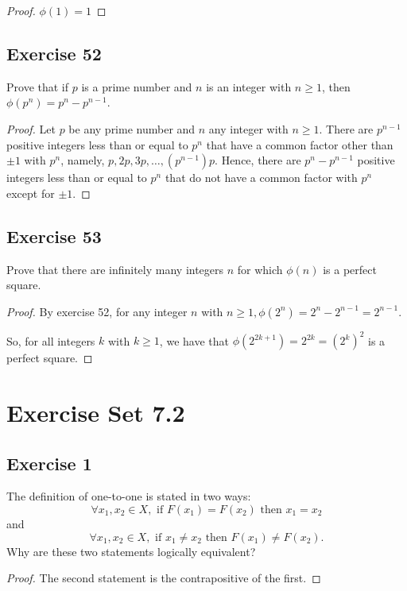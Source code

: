 \documentclass[14pt]{extarticle}
\begin{document}
\begin{proof}
    \(\phi(1) = 1\)
\end{proof}

\subsection{Exercise 52}
Prove that if $p$ is a prime number and $n$ is an integer with \(n \geq 1\), then \(\phi(p^n) = p^n - p^{n-1}\).

\begin{proof}
    Let $p$ be any prime number and $n$ any integer with \(n \geq 1\). There are \(p^{n-1}\) positive integers less than
    or equal to \(p^n\) that have a common factor other than $\pm 1$ with \(p^n\), namely, \(p, 2p, 3p, \ldots,
    (p^{n-1})p\). Hence, there are \(p^n - p^{n-1}\) positive integers less than or equal to \(p^n\) that do not have a
    common factor with \(p^n\) except for $\pm 1$.
\end{proof}

\subsection{Exercise 53}
Prove that there are infinitely many integers $n$ for which \(\phi(n)\) is a perfect square.

\begin{proof}
    By exercise 52, for any integer $n$ with \(n \geq 1, \phi(2^n) = 2^n - 2^{n-1} = 2^{n-1}\).

    So, for all integers $k$ with $k \geq 1$, we have that \(\phi(2^{2k+1}) = 2^{2k} = (2^k)^2\) is a perfect square.
\end{proof}

\section{Exercise Set 7.2}

\subsection{Exercise 1}
The definition of one-to-one is stated in two ways:
\[
    \forall x_1, x_2 \in X, \text{ if } F(x_1) = F(x_2) \text{ then } x_1 = x_2
\]
and
\[
    \forall x_1, x_2 \in X, \text{ if } x_1 \neq x_2 \text{ then } F(x_1) \neq F(x_2).
\]
Why are these two statements logically equivalent?

\begin{proof}
    The second statement is the contrapositive of the first.
\end{proof}
\end{document}
